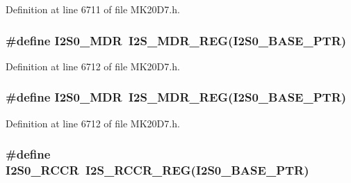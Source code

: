 Definition at line 6711 of file M\+K20\+D7.\+h.

\subsubsection[{\texorpdfstring{I2\+S0\+\_\+\+M\+DR}{I2S0_MDR}}]{\setlength{\rightskip}{0pt plus 5cm}\#define I2\+S0\+\_\+\+M\+DR~{\bf I2\+S\+\_\+\+M\+D\+R\+\_\+\+R\+EG}({\bf I2\+S0\+\_\+\+B\+A\+S\+E\+\_\+\+P\+TR})}\hypertarget{group___i2_s___register___accessor___macros_ga8d4df147e022a1cd6e739291b0f21438}{}\label{group___i2_s___register___accessor___macros_ga8d4df147e022a1cd6e739291b0f21438}


Definition at line 6712 of file M\+K20\+D7.\+h.

\subsubsection[{\texorpdfstring{I2\+S0\+\_\+\+M\+DR}{I2S0_MDR}}]{\setlength{\rightskip}{0pt plus 5cm}\#define I2\+S0\+\_\+\+M\+DR~{\bf I2\+S\+\_\+\+M\+D\+R\+\_\+\+R\+EG}({\bf I2\+S0\+\_\+\+B\+A\+S\+E\+\_\+\+P\+TR})}\hypertarget{group___i2_s___register___accessor___macros_ga8d4df147e022a1cd6e739291b0f21438}{}\label{group___i2_s___register___accessor___macros_ga8d4df147e022a1cd6e739291b0f21438}


Definition at line 6712 of file M\+K20\+D7.\+h.

\subsubsection[{\texorpdfstring{I2\+S0\+\_\+\+R\+C\+CR}{I2S0_RCCR}}]{\setlength{\rightskip}{0pt plus 5cm}\#define I2\+S0\+\_\+\+R\+C\+CR~{\bf I2\+S\+\_\+\+R\+C\+C\+R\+\_\+\+R\+EG}({\bf I2\+S0\+\_\+\+B\+A\+S\+E\+\_\+\+P\+TR})}\hypertarget{group___i2_s___register___accessor___macros_ga97fef8ffbb3e2719fec418aca185093c}{}\label{group___i2_s___register___accessor___macros_ga97fef8ffbb3e2719fec418aca185093c}


